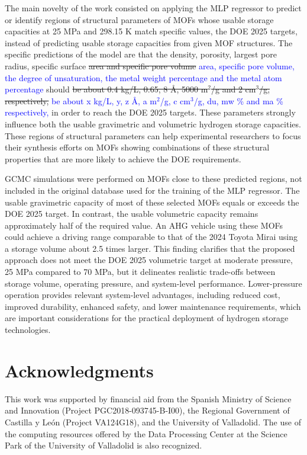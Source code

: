 \documentclass[review]{elsarticle}
\begin{document}
The main novelty of the work consisted on applying the MLP regressor to predict 
or identify regions of structural parameters of MOFs whose usable storage 
capacities at 25 MPa and 298.15 K match specific values, the DOE 2025 targets, 
instead of predicting usable storage capacities from given MOF structures. 
The specific predictions of the model are that the density, porosity, largest 
pore radius, specific surface \sout{area and specific pore volume} 
\textcolor{blue}{area, specific pore volume, the degree of unsaturation, the
metal weight percentage and the metal atom percentage} should \sout{be about 
0.4 kg/L, 0.65, 8 \AA{}, 5000 m$^2$/g and 2 cm$^3$/g, respectively,} 
\textcolor{blue}{be about x kg/L, y, z \AA{}, a m$^2$/g, c cm$^3$/g, du, mw \% 
and ma \% respectively,} in order to reach the DOE 2025 targets. These 
parameters strongly influence both the usable gravimetric and volumetric 
hydrogen storage capacities. These regions of structural parameters can help 
experimental researchers to focus their synthesis efforts on MOFs showing 
combinations of these structural properties that are more likely to achieve the 
DOE requirements. 
 
GCMC simulations were performed on MOFs close to these predicted regions, not 
included in the original database used for the training of the MLP regressor. 
The usable gravimetric capacity of most of these selected MOFs equals or 
exceeds the DOE 2025 target. In contrast, the usable volumetric capacity 
remains approximately half of the required value. An AHG vehicle using these 
MOFs could achieve a driving range comparable to that of the 2024 Toyota 
Mirai using a storage volume about 2.5 times larger. This finding clarifies 
that the proposed approach does not meet the DOE 2025 volumetric target at 
moderate pressure, 25 MPa compared to 70 MPa, but it delineates realistic 
trade-offs between storage volume, operating pressure, and system-level 
performance. Lower-pressure operation provides relevant system-level 
advantages, including reduced cost, improved durability, enhanced safety, and 
lower maintenance requirements, which are important considerations for the 
practical deployment of hydrogen storage technologies. 



\section{Acknowledgments}
This work was supported by financial aid from the Spanish Ministry of Science 
and Innovation (Project PGC2018-093745-B-I00), the Regional Government of 
Castilla y León (Project VA124G18), and the University of Valladolid. The use 
of the computing resources offered by the Data Processing Center at the Science 
Park of the University of Valladolid is also recognized.
\end{document}

